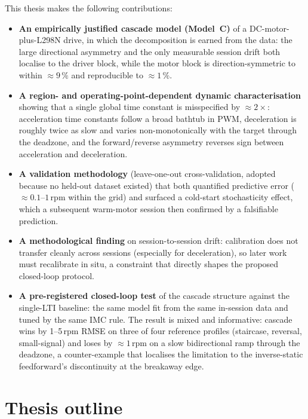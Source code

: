 This thesis makes the following contributions:
\begin{itemize}
  \item \textbf{An empirically justified cascade model (Model~C)} of a DC-motor-plus-L298N drive, in which the decomposition is earned from the data: the large directional asymmetry and the only measurable session drift both localise to the driver block, while the motor block is direction-symmetric to within ${\approx}9\,\%$ and reproducible to ${\approx}1\,\%$.
  \item \textbf{A region- and operating-point-dependent dynamic characterisation} showing that a single global time constant is misspecified by ${\approx}2\times$: acceleration time constants follow a broad bathtub in PWM, deceleration is roughly twice as slow and varies non-monotonically with the target through the deadzone, and the forward/reverse asymmetry reverses sign between acceleration and deceleration.
  \item \textbf{A validation methodology} (leave-one-out cross-validation, adopted because no held-out dataset existed) that both quantified predictive error (${\approx}0.1$--$1\,$rpm within the grid) and surfaced a cold-start stochasticity effect, which a subsequent warm-motor session then confirmed by a falsifiable prediction.
  \item \textbf{A methodological finding} on session-to-session drift: calibration does not transfer cleanly across sessions (especially for deceleration), so later work must recalibrate in situ, a constraint that directly shapes the proposed closed-loop protocol.
  \item \textbf{A pre-registered closed-loop test} of the cascade structure against the single-LTI baseline: the same model fit from the same in-session data and tuned by the same IMC rule. The result is mixed and informative: cascade wins by 1--5\,rpm RMSE on three of four reference profiles (staircase, reversal, small-signal) and loses by ${\approx}1$\,rpm on a slow bidirectional ramp through the deadzone, a counter-example that localises the limitation to the inverse-static feedforward's discontinuity at the breakaway edge.
\end{itemize}

\section{Thesis outline}

